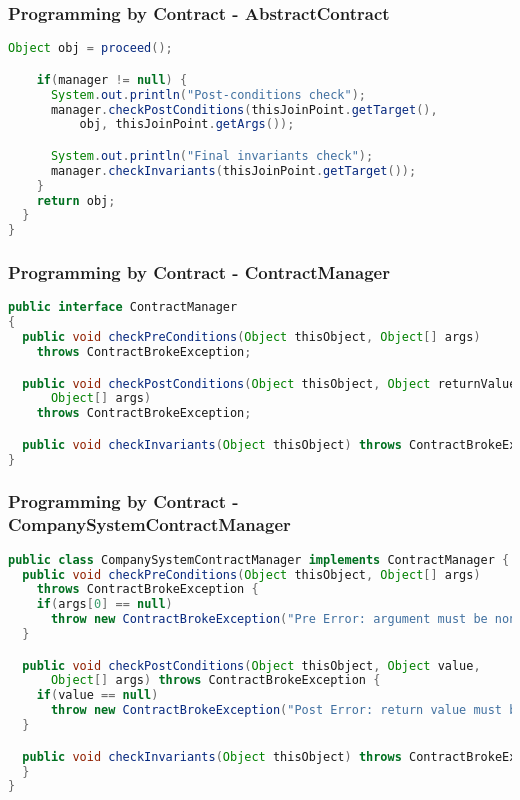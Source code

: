 \documentclass[11pt]{beamer}
\begin{document}
\begin{frame}[fragile]
   \frametitle{Programming by Contract - AbstractContract}
{\scriptsize
\begin{lstlisting}[language=java]
    Object obj = proceed();

    if(manager != null) {
      System.out.println("Post-conditions check");
      manager.checkPostConditions(thisJoinPoint.getTarget(),
          obj, thisJoinPoint.getArgs());

      System.out.println("Final invariants check");
      manager.checkInvariants(thisJoinPoint.getTarget());
    }
    return obj;
  }
}
\end{lstlisting}}
\end{frame}

\begin{frame}[fragile]
   \frametitle{Programming by Contract - ContractManager}
{\tiny
\begin{lstlisting}[language=java]
public interface ContractManager
{
  public void checkPreConditions(Object thisObject, Object[] args)
    throws ContractBrokeException;

  public void checkPostConditions(Object thisObject, Object returnValue,
      Object[] args)
    throws ContractBrokeException;

  public void checkInvariants(Object thisObject) throws ContractBrokeException;
}
\end{lstlisting}}
\end{frame}

\begin{frame}[fragile]
   \frametitle{Programming by Contract - CompanySystemContractManager}
{\tiny
\begin{lstlisting}[language=java]
public class CompanySystemContractManager implements ContractManager {
  public void checkPreConditions(Object thisObject, Object[] args)
    throws ContractBrokeException {
    if(args[0] == null)
      throw new ContractBrokeException("Pre Error: argument must be non-null");
  }

  public void checkPostConditions(Object thisObject, Object value,
      Object[] args) throws ContractBrokeException {
    if(value == null)
      throw new ContractBrokeException("Post Error: return value must be non-null");
  }

  public void checkInvariants(Object thisObject) throws ContractBrokeException {
  }
}
\end{lstlisting}}
\end{frame}
\end{document}
